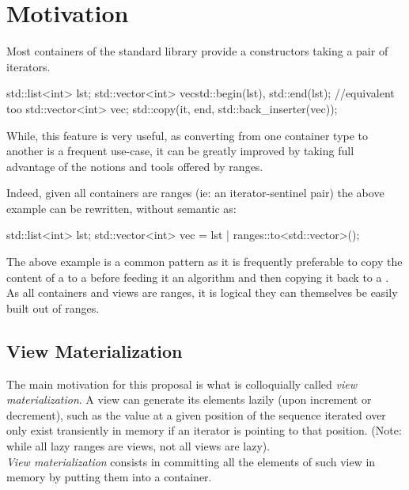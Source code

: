 \documentclass{wg21}
\begin{document}
\section{Motivation}

Most containers of the standard library provide a constructors taking a pair of iterators.

\begin{colorblock}
    std::list<int> lst;
    std::vector<int> vec{std::begin(lst), std::end(lst)};
    //equivalent too
    std::vector<int> vec;
    std::copy(it, end, std::back_inserter(vec));
\end{colorblock}

While, this feature is very useful, as converting from one container type to another is a frequent
use-case, it can be greatly improved by taking full advantage of the notions and tools offered by ranges.

Indeed, given all containers are ranges (ie: an iterator-sentinel pair) the above example can be rewritten, without semantic as:

\begin{colorblock}
    std::list<int> lst;
    std::vector<int> vec = lst | ranges::to<std::vector>();
\end{colorblock}


The above example is a common pattern as it is frequently preferable to copy the content of a  to
a  before feeding it an algorithm and then copying it back to a .\\

As all containers and views are ranges, it is logical they can themselves be easily built out of ranges.

\subsection{View Materialization}

The main motivation for this proposal is what is colloquially called \emph{view materialization}.
A view can generate its elements lazily (upon increment or decrement), such as the value at a given position of the sequence
iterated over only exist transiently in memory if an iterator is pointing to that position.
(Note: while all lazy ranges are views, not all views are lazy).\\

\emph{View materialization} consists in committing all the elements of such view in memory by putting them into a container.
\end{document}
